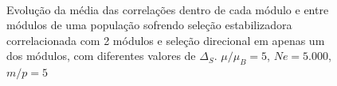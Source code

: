 \begin{figure}[htbp]
   \vspace{-18pt}
   \vspace{11pt}
   \\
   \caption{ Evolução da média das correlações dentro de cada módulo
      e entre módulos de uma população sofrendo seleção estabilizadora
      correlacionada com 2 módulos e seleção direcional em apenas um dos
   módulos, com diferentes valores de $\Delta_S$. $\mu/\mu_B = 5$, $Ne = 5.000$, $m/p=5$}
   \label{CoAVG}
\end{figure}

